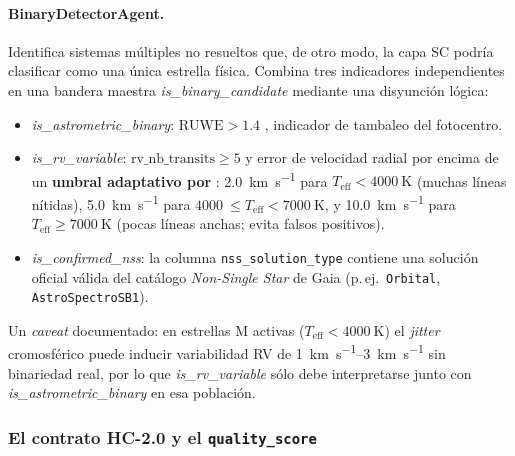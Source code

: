 \paragraph{BinaryDetectorAgent.} Identifica sistemas múltiples no resueltos que, de
otro modo, la capa SC podría clasificar como una única estrella física. Combina 
tres indicadores independientes en una bandera maestra \emph{is\_binary\_candidate} 
mediante una disyunción lógica:
\begin{itemize}
  \item \emph{is\_astrometric\_binary}: $\mathrm{RUWE} > 1.4$
  \citep{lindegren2021}, indicador de tambaleo del fotocentro.
  \item \emph{is\_rv\_variable}: $\mathrm{rv\_nb\_transits} \ge 5$ y error de
  velocidad radial por encima de un \textbf{umbral adaptativo por \teff{}}:
  \SI{2.0}{\kilo\meter\per\second} para $T_\mathrm{eff} < \SI{4000}{\kelvin}$
  (muchas líneas nítidas), \SI{5.0}{\kilo\meter\per\second} para
  $\SI{4000}{} \le T_\mathrm{eff} < \SI{7000}{\kelvin}$, y
  \SI{10.0}{\kilo\meter\per\second} para $T_\mathrm{eff} \ge \SI{7000}{\kelvin}$
  (pocas líneas anchas; evita falsos positivos).
  \item \emph{is\_confirmed\_nss}: la columna \verb|nss_solution_type| contiene una
  solución oficial válida del catálogo \emph{Non-Single Star} de Gaia
  (p.\,ej.\ \texttt{Orbital}, \texttt{AstroSpectroSB1}).
\end{itemize}
Un \emph{caveat} documentado: en estrellas M activas
($T_\mathrm{eff} < \SI{4000}{\kelvin}$) el \emph{jitter} cromosférico puede inducir
variabilidad RV de \SIrange{1}{3}{\kilo\meter\per\second} sin binariedad real, por
lo que \emph{is\_rv\_variable} sólo debe interpretarse junto con
\emph{is\_astrometric\_binary} en esa población.

\subsubsection{El contrato HC-2.0 y el \texttt{quality\_score}}
\label{sec:contrato}

